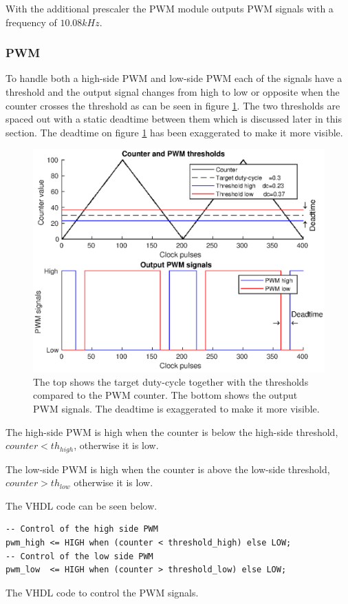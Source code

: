With the additional prescaler the PWM module outputs PWM signals with a frequency of $10.08kHz$.

\subsubsection*{PWM}


To handle both a high-side PWM and low-side PWM each of the signals have a threshold and the output signal changes from high to low or opposite when the counter crosses the threshold as can be seen in figure \ref{fig:counter_with_pwm}. The two thresholds are spaced out with a static deadtime between them which is discussed later in this section. The deadtime on figure \ref{fig:counter_with_pwm} has been exaggerated to make it more visible.

\begin{figure}[H]
	\centering
	\includegraphics[width=0.85 \textwidth]{pictures/software/counter_with_pwm.eps}
	\caption{The top shows the target duty-cycle together with the thresholds compared to the PWM counter. The bottom shows the output PWM signals. The deadtime is exaggerated to make it more visible.}
	\label{fig:counter_with_pwm}
\end{figure}

The high-side PWM is high when the counter is below the high-side threshold, $counter < th_{high}$, otherwise it is low. 

The low-side PWM is high when the counter is above the low-side threshold, $counter > th_{low}$ otherwise it is low.

\newpage

The VHDL code can be seen below.

\begin{verbatim}
-- Control of the high side PWM
pwm_high <= HIGH when (counter < threshold_high) else LOW;
-- Control of the low side PWM
pwm_low  <= HIGH when (counter > threshold_low) else LOW;
\end{verbatim}
\begin{center}
    The VHDL code to control the PWM signals.
\end{center}


